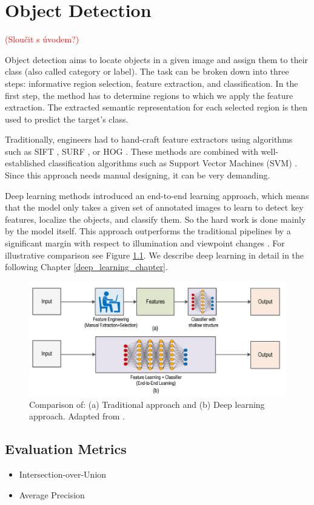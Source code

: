 \chapter{Object Detection}
\textcolor{red}{(Sloučit s úvodem?)}

Object detection aims to locate objects in a given image and assign them to their class (also called category or label). The task can be broken down into three steps: informative region selection, feature extraction, and classification. In the first step, the method has to determine regions to which we apply the feature extraction. The extracted semantic representation for each selected region is then used to predict the target's class. 

Traditionally, engineers had to hand-craft feature extractors using algorithms such as SIFT \cite{sift}, SURF \cite{surf}, or HOG \cite{hog}. These methods are combined with well-established classification algorithms such as Support Vector Machines (SVM) \cite{svm}. Since this approach needs manual designing, it can be very demanding.

Deep learning methods introduced an end-to-end learning approach, which means that the model only takes a given set of annotated images to learn to detect key features, localize the objects, and classify them. So the hard work is done mainly by the model itself. This approach outperforms the traditional pipelines by a significant margin with respect to illumination and viewpoint changes \cite{outperforming}. For illustrative comparison see Figure \ref{fig:comparison}. We describe deep learning in detail in the following Chapter \ref{deep_learning_chapter}.

\begin{figure}[h]
    \centering
    \includegraphics[width=\linewidth]{Sources/Figures/comparison.png}
    \caption{Comparison of: (a) Traditional approach and (b) Deep learning approach. Adapted from \cite{comparison_illustration}. }
    \label{fig:comparison}
\end{figure}

\section{Evaluation Metrics}
\begin{itemize}
    \item Intersection-over-Union
    \item Average Precision
\end{itemize}

